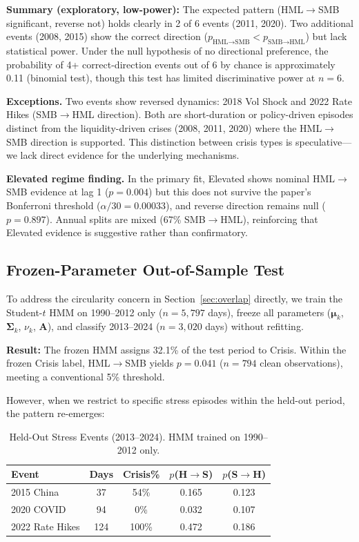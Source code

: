 \documentclass{uai2026}
\begin{document}
\textbf{Summary (exploratory, low-power):} The expected pattern (HML$\to$SMB
significant, reverse not) holds clearly in 2 of 6 events (2011, 2020). Two additional
events (2008, 2015)
show the correct direction ($p_{\text{HML}\to\text{SMB}} < p_{\text{SMB}\to\text{HML}}$)
but lack statistical power. Under the null hypothesis of no directional preference,
the probability of 4+ correct-direction events out of 6 by chance is approximately
0.11 (binomial test), though this test has limited discriminative power at $n = 6$.

\textbf{Exceptions.} Two events show reversed dynamics: 2018 Vol Shock and
2022 Rate Hikes (SMB$\to$HML direction). Both are short-duration or
policy-driven episodes distinct from the liquidity-driven crises (2008, 2011, 2020)
where the HML$\to$SMB direction is supported. This distinction between crisis
types is speculative---we lack direct evidence for the underlying mechanisms.

\textbf{Elevated regime finding.} In the primary fit, Elevated shows nominal
HML$\to$SMB evidence at lag 1 ($p = 0.004$) but this does not survive the
paper's Bonferroni threshold ($\alpha/30 = 0.00033$), and reverse direction
remains null ($p = 0.897$). Annual splits are mixed (67\% SMB$\to$HML),
reinforcing that Elevated evidence is suggestive rather than confirmatory.

\subsection{Frozen-Parameter Out-of-Sample Test}
\label{sec:frozen_oos}

To address the circularity concern in Section~\ref{sec:overlap} directly, we train
the Student-$t$ HMM on 1990--2012 only ($n = 5{,}797$ days), freeze all parameters
($\boldsymbol{\mu}_k$, $\boldsymbol{\Sigma}_k$, $\nu_k$, $\mathbf{A}$), and classify
2013--2024 ($n = 3{,}020$ days) without refitting.

\textbf{Result:} The frozen HMM assigns 32.1\% of the test period to Crisis.
Within the frozen Crisis label, HML$\to$SMB yields $p = 0.041$
($n = 794$ clean observations), meeting a conventional 5\% threshold.

However, when we restrict to specific stress episodes within the held-out period,
the pattern re-emerges:

\begin{table}[t]
\centering
\caption{Held-Out Stress Events (2013--2024). HMM trained on 1990--2012 only.}
\label{tab:frozen_events}
\scriptsize
\begin{tabular}{@{}lcccc@{}}
\toprule
Event & Days & Crisis\% & $p$(H$\to$S) & $p$(S$\to$H) \\
\midrule
2015 China & 37 & 54\% & 0.165 & 0.123 \\
2020 COVID & 94 & 0\% & 0.032 & 0.107 \\
2022 Rate Hikes & 124 & 100\% & 0.472 & 0.186 \\
\bottomrule
\end{tabular}
\end{table}
\end{document}
